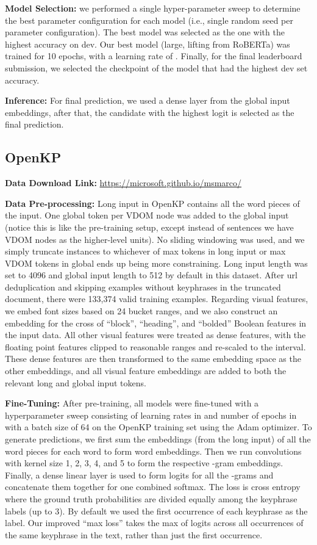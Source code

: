 \documentclass[11pt,a4paper]{article}
\begin{document}
{\bf Model Selection:} we performed a single hyper-parameter sweep to determine the best parameter configuration for each model (i.e., single random seed per parameter configuration). The best model was selected as the one with the highest accuracy on dev. Our best model (large, lifting from RoBERTa) was trained for 10 epochs, with a learning rate of . Finally, for the final leaderboard submission, we selected the checkpoint of the model that had the highest dev set accuracy.


{\bf Inference:} For final prediction, we used a dense layer from the global input embeddings, after that, the candidate with the highest logit is selected as the final prediction.


\subsection*{OpenKP} 

{\bf Data Download Link:} \url{https://microsoft.github.io/msmarco/}


{\bf Data Pre-processing:} Long input in OpenKP contains all the word pieces of the input. One global token per VDOM node was added to the global input (notice this is like the pre-training setup, except instead of sentences we have VDOM nodes as the higher-level units). No sliding windowing was used, and we simply truncate instances to whichever of max tokens in long input or max VDOM tokens in global ends up being more constraining. Long input length was set to 4096 and global input length to 512 by default in this dataset. After url deduplication and skipping examples without keyphrases in the truncated document, there were 133,374 valid training examples. Regarding visual features, we embed font sizes based on 24 bucket ranges, and we also construct an embedding for the cross of ``block'', ``heading'', and ``bolded'' Boolean features in the input data.  All other visual features were treated as dense features, with the floating point features clipped to reasonable ranges and re-scaled to the  interval.  These dense features are then transformed to the same embedding space as the other embeddings, and all visual feature embeddings are added to both the relevant long and global input tokens. 

{\bf Fine-Tuning:} After pre-training, all models were fine-tuned with a hyperparameter sweep consisting of learning rates in  and number of epochs in  with a batch size of 64 on the OpenKP training set using the Adam optimizer. To generate predictions,  we first sum the embeddings (from the long input) of all the word pieces for each word to form word embeddings. Then we run convolutions with kernel size 1, 2, 3, 4, and 5 to form the respective -gram embeddings. Finally, a dense linear layer is used to form logits for all the -grams and concatenate them together for one combined softmax. The loss is cross entropy where the ground truth probabilities are divided equally among the keyphrase labels (up to 3). By default we used the first occurrence of each keyphrase as the label. Our improved ``max loss'' takes the max of logits across all occurrences of the same keyphrase in the text, rather than just the first occurrence. 
\end{document}
